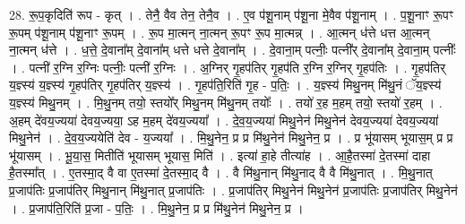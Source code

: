 \documentclass[17pt]{extarticle}
\begin{document}
28. रू॒प॒कृदिति॑ रूप - कृत् । . तेनै॒ वैव तेन॒ तेनै॒व । . ए॒व प॑शू॒नाम् प॑शू॒ना मे॒वैव प॑शू॒नाम् । . प॒शू॒नाꣳ रू॒पꣳ रू॒पम् प॑शू॒नाम् प॑शू॒नाꣳ रू॒पम् । . रू॒प मा॒त्मन् ना॒त्मन् रू॒पꣳ रू॒प मा॒त्मन्न् । . आ॒त्मन् ध॑त्ते धत्त आ॒त्मन् ना॒त्मन् ध॑त्ते । . ध॒त्ते॒ दे॒वाना᳚म् दे॒वाना᳚म् धत्ते धत्ते दे॒वाना᳚म् । . दे॒वाना॒म् पत्नीः॒ पत्नी᳚र् दे॒वाना᳚म् दे॒वाना॒म् पत्नीः᳚ । . पत्नी॑ र॒ग्नि र॒ग्निः पत्नीः॒ पत्नी॑ र॒ग्निः । . अ॒ग्निर् गृ॒हप॑तिर् गृ॒हप॑ति र॒ग्नि र॒ग्निर् गृ॒हप॑तिः । . गृ॒हप॑तिर् य॒ज्ञ्स्य॑ य॒ज्ञ्स्य॑ गृ॒हप॑तिर् गृ॒हप॑तिर् य॒ज्ञ्स्य॑ । . गृ॒हप॑ति॒रिति॑ गृ॒ह - प॒तिः॒ । . य॒ज्ञ्स्य॑ मिथु॒नम् मि॑थु॒नं ॅय॒ज्ञ्स्य॑ य॒ज्ञ्स्य॑ मिथु॒नम् । . मि॒थु॒नम् तयो॒ स्तयो᳚र् मिथु॒नम् मि॑थु॒नम् तयोः᳚ । . तयो॑ र॒ह म॒हम् तयो॒ स्तयो॑ र॒हम् । . अ॒हम् दे॑वय॒ज्यया॑ देवय॒ज्यया॒ ऽह म॒हम् दे॑वय॒ज्यया᳚ । . दे॒व॒य॒ज्यया॑ मिथु॒नेन॑ मिथु॒नेन॑ देवय॒ज्यया॑ देवय॒ज्यया॑ मिथु॒नेन॑ । . दे॒व॒य॒ज्ययेति॑ देव - य॒ज्यया᳚ । . मि॒थु॒नेन॒ प्र प्र मि॑थु॒नेन॑ मिथु॒नेन॒ प्र । . प्र भू॑यासम् भूयास॒म् प्र प्र भू॑यासम् । . भू॒या॒स॒ मितीति॑ भूयासम् भूयास॒ मिति॑ । . इत्या॑ हा॒हे तीत्या॑ह । . आ॒है॒तस्मा॑ दे॒तस्मा॑ दाहा है॒तस्मा᳚त् । . ए॒तस्मा॒द् वै वा ए॒तस्मा॑ दे॒तस्मा॒द् वै । . वै मि॑थु॒नान् मि॑थु॒नाद् वै वै मि॑थु॒नात् । . मि॒थु॒नात् प्र॒जाप॑तिः प्र॒जाप॑तिर् मिथु॒नान् मि॑थु॒नात् प्र॒जाप॑तिः । . प्र॒जाप॑तिर् मिथु॒नेन॑ मिथु॒नेन॑ प्र॒जाप॑तिः प्र॒जाप॑तिर् मिथु॒नेन॑ । . प्र॒जाप॑ति॒रिति॑ प्र॒जा - प॒तिः॒ । . मि॒थु॒नेन॒ प्र प्र मि॑थु॒नेन॑ मिथु॒नेन॒ प्र । \newline
\end{document}
